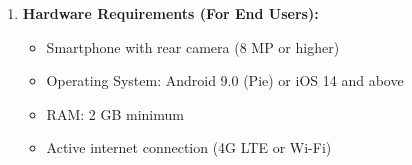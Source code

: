 \documentclass[12pt]{article}
\begin{document}
\begin{enumerate}[label={\Roman*.}]
    \item \textbf{Hardware Requirements (For End Users):}
    \begin{itemize}
        \item Smartphone with rear camera (8 MP or higher)
        \item Operating System: Android 9.0 (Pie) or iOS 14 and above
        \item RAM: 2 GB minimum
        \item Active internet connection (4G LTE or Wi-Fi)
    \end{itemize}
\end{enumerate}
\end{document}
